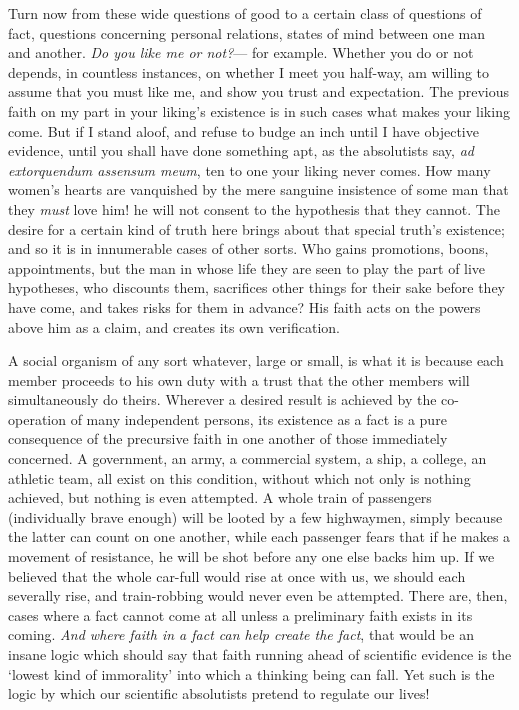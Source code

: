\documentclass[12pt]{article}
\begin{document}
Turn now from these wide questions of good to a certain class of questions of fact, questions concerning personal relations, states of mind between one man and another.  \emph{Do you like me or not?}--- for example.  Whether you do or not depends, in countless instances, on whether I meet you half-way, am willing to assume that you must like me, and show you trust and expectation.  The previous faith on my part in your liking's existence is in such cases what makes  your liking come.  But if I stand aloof, and refuse to budge an inch until I have objective evidence, until you shall have done something apt, as the absolutists say, \emph{ad extorquendum assensum meum}, ten to one your liking never comes.  How many women's hearts are vanquished by the mere sanguine insistence of some man that they \emph{must} love him! he will not consent to the hypothesis that they cannot.  The desire for a certain kind of truth here brings about that special truth's existence; and so it is in innumerable cases of other sorts.  Who gains promotions, boons, appointments, but the man in whose life they are seen to play the part of live hypotheses, who discounts them, sacrifices other things for their sake before they have come, and takes risks for them in advance?  His faith acts on the powers above him as a claim, and creates its own verification.

A social organism of any sort whatever, large or small, is what it is because each member proceeds to his own duty with a trust that the other members will simultaneously do theirs.  Wherever a desired result is achieved by the co-operation of many independent persons, its existence as a fact is a pure consequence of the precursive faith in one another of those immediately concerned.  A government, an army, a commercial system, a ship, a college, an athletic team, all exist on this condition, without which not only is nothing achieved, but nothing is even attempted.  A whole train of passengers (individually brave enough) will be looted by a few highwaymen, simply because the latter can count on one another, while each passenger fears that if he makes a movement of resistance, he will be shot before any one else backs him up.  If we believed that the whole car-full would rise  at once with us, we should each severally rise, and train-robbing would never even be attempted.  There are, then, cases where a fact cannot come at all unless a preliminary faith exists in its coming.  \emph{And where faith in a fact can help create the fact}, that would be an insane logic which should say that faith running ahead of scientific evidence is the `lowest kind of immorality' into which a thinking being can fall.  Yet such is the logic by which our scientific absolutists pretend to regulate our lives!
\end{document}
